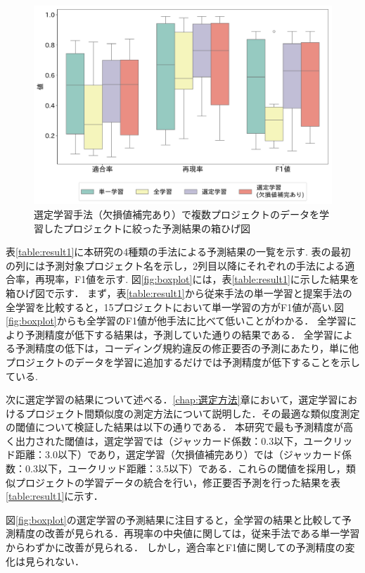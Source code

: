 \documentclass[paper]{ieicej}
\begin{document}
\begin{figure}[t]
	\centering
	\includegraphics[width=1\linewidth]{fig/boxplot_filtered.pdf}
	\caption{選定学習手法（欠損値補完あり）で複数プロジェクトのデータを学習したプロジェクトに絞った予測結果の箱ひげ図}
	\label{fig:boxplot_filtered}
\end{figure}

表\ref{table:result1}に本研究の4種類の手法による予測結果の一覧を示す.
表の最初の列には予測対象プロジェクト名を示し，2列目以降にそれぞれの手法による適合率，再現率，F1値を示す.
図\ref{fig:boxplot}には，表\ref{table:result1}に示した結果を箱ひげ図で示す．
まず，表\ref{table:result1}から従来手法の単一学習と提案手法の全学習を比較すると，15プロジェクトにおいて単一学習の方がF1値が高い.図\ref{fig:boxplot}からも全学習のF1値が他手法に比べて低いことがわかる．
全学習により予測精度が低下する結果は，予測していた通りの結果である．
全学習による予測精度の低下は，コーディング規約違反の修正要否の予測にあたり，単に他プロジェクトのデータを学習に追加するだけでは予測精度が低下することを示している.

次に選定学習の結果について述べる．\ref{chap:選定方法}章において，選定学習におけるプロジェクト間類似度の測定方法について説明した．その最適な類似度測定の閾値について検証した結果は以下の通りである．
本研究で最も予測精度が高く出力された閾値は，選定学習では（ジャッカード係数：0.3以下，ユークリッド距離：3.0以下）であり，選定学習（欠損値補完あり）では（ジャッカード係数：0.3以下，ユークリッド距離：3.5以下）である．これらの閾値を採用し，類似プロジェクトの学習データの統合を行い，修正要否予測を行った結果を表\ref{table:result1}に示す．

図\ref{fig:boxplot}の選定学習の予測結果に注目すると，全学習の結果と比較して予測精度の改善が見られる．再現率の中央値に関しては，従来手法である単一学習からわずかに改善が見られる．
しかし，適合率とF1値に関しての予測精度の変化は見られない．
\end{document}
